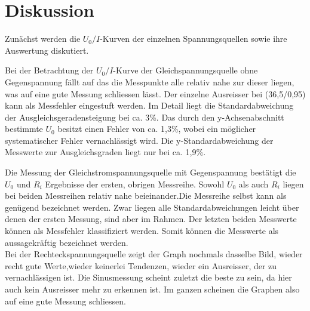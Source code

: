 \section{Diskussion}
\label{sec:Diskussion}


Zunächst werden die $U_0/I $-Kurven der einzelnen Spannungsquellen sowie ihre Auswertung diskutiert.

Bei der Betrachtung der $U_0 /I$-Kurve der Gleichspannungsquelle ohne Gegenspannung
fällt auf das die Messpunkte alle relativ nahe zur dieser liegen, was auf eine gute
Messung schliessen lässt. Der einzelne Ausreisser bei (36,5/0,95) kann als Messfehler
eingestuft werden.
 Im Detail liegt die Standardabweichung der Ausgleichsgeradensteigung bei ca. 3\%. Das durch den
 y-Achsenabschnitt bestimmte $U_0$ besitzt einen Fehler von ca. 1,3\%, wobei ein möglicher
 systematischer Fehler vernachlässigt wird.
 Die y-Standardabweichung der Messwerte zur Ausgleichsgraden liegt nur bei ca. 1,9\%.

Die Messung der Gleichstromspannungsquelle mit Gegenspannung bestätigt die $U_0$ und $R_i$ Ergebnisse
der ersten, obrigen Messreihe. Sowohl $U_0$ als auch $R_i$ liegen bei beiden Messreihen
 relativ nahe beieinander.Die Messreihe selbst kann als genügend bezeichnet werden.
 Zwar liegen alle Standardabweichungen leicht über denen der ersten Messung,
 sind aber im Rahmen.
 Der letzten beiden Messwerte können als Messfehler klassifiziert werden.
 Somit können die Messwerte als aussagekräftig bezeichnet werden.
\\
 Bei der Rechteckspannungsquelle zeigt der Graph nochmals dasselbe
Bild, wieder recht gute Werte,wieder keinerlei Tendenzen, wieder ein Ausreisser, der
zu vernachlässigen ist. Die Sinusmessung scheint zuletzt die beste zu sein, da hier auch
kein Ausreisser mehr zu erkennen ist. Im ganzen scheinen die Graphen also auf eine
gute Messung schliessen.
